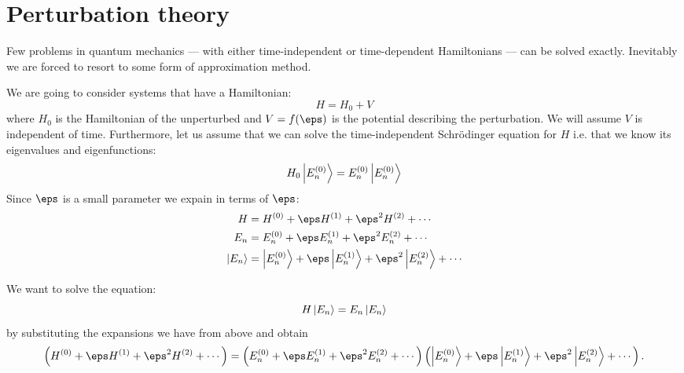 \documentclass[12pt, a4paper]{article}
\begin{document}

\section{Perturbation theory}

Few problems in quantum mechanics --- with either time-independent or time-dependent Hamiltonians --- can be solved exactly. Inevitably we are forced to resort to some form of approximation method.

\noindent We are going to consider systems that have a Hamiltonian:
\[H=H_0+V\] 
where \(H_0\) is the Hamiltonian of the unperturbed and \(V=f(\eps)\) is the potential describing the perturbation. We will assume \(V\) is independent of time. Furthermore, let us assume that we can solve the time-independent Schrödinger equation for \(H\) i.e. that we know its eigenvalues and eigenfunctions:
\[H_0\ket{E^{(0)}_n} =E^{(0)}_n \ket{E^{(0)}_n}\]
Since \(\eps\) is a small parameter we expain in terms of \(\eps\):
\[\begin{aligned}
    H &= H^{(0)} +\eps H^{(1)}+\eps^2 H^{(2)} +\cdots \\
    E_n &= E_n^{(0)} +\eps E_n^{(1)}+\eps^2 E_n^{(2)} +\cdots \\
    \ket{E_n} &= \ket{E_n^{(0)}} +\eps \ket{E_n^{(1)}}+\eps^2 \ket{E_n^{(2)}} +\cdots
\end{aligned}\]

We want to solve the equation:
\[H\ket{E_n}=E_n \ket{E_n}\]
by substituting the expansions we have from above and obtain 
\[\left( H^{(0)} +\eps H^{(1)}+\eps^2 H^{(2)} +\cdots \right) = \left( E_n^{(0)} +\eps E_n^{(1)}+\eps^2 E_n^{(2)} +\cdots \right)\left( \ket{E_n^{(0)}} +\eps \ket{E_n^{(1)}}+\eps^2 \ket{E_n^{(2)}} +\cdots \right).\]
\end{document}
